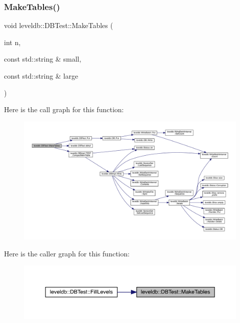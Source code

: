 \subsubsection{\texorpdfstring{MakeTables()}{MakeTables()}}
{\footnotesize\ttfamily void leveldb\+::\+D\+B\+Test\+::\+Make\+Tables (\begin{DoxyParamCaption}\item[{int}]{n,  }\item[{const std\+::string \&}]{small,  }\item[{const std\+::string \&}]{large }\end{DoxyParamCaption})\hspace{0.3cm}{\ttfamily [inline]}}

Here is the call graph for this function\+:
\nopagebreak
\begin{figure}[H]
\begin{center}
\leavevmode
\includegraphics[width=350pt]{classleveldb_1_1_d_b_test_ace931478fa5ad2c48a8aa95a344e19fd_cgraph}
\end{center}
\end{figure}
Here is the caller graph for this function\+:
\nopagebreak
\begin{figure}[H]
\begin{center}
\leavevmode
\includegraphics[width=350pt]{classleveldb_1_1_d_b_test_ace931478fa5ad2c48a8aa95a344e19fd_icgraph}
\end{center}
\end{figure}
\mbox{\label{classleveldb_1_1_d_b_test_aa7c845810f6d57b0655eda370e8de33f}} 
